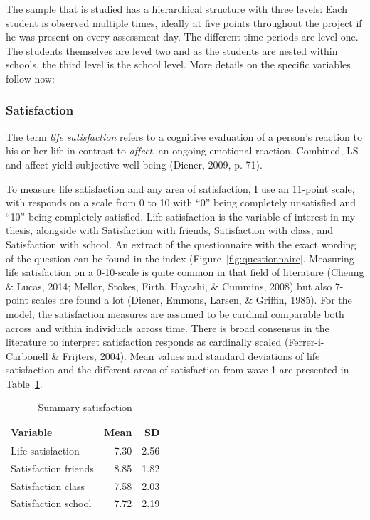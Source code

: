\documentclass[a4, 12pt]{article}
\begin{document}
\label{sec:variables}
The sample that is studied has a hierarchical structure with three levels: Each student is observed multiple times, ideally at five points throughout the project if he was present on every assessment day. The different time periods are level one. The students themselves are level two and as the students are nested within schools, the third level is the school level. More details on the specific variables follow now:

\hypertarget{satisfaction}{%
\subsubsection{Satisfaction}\label{satisfaction}}

The term \emph{life satisfaction} refers to a cognitive evaluation of a person's reaction to his or her life in contrast to \emph{affect}, an ongoing emotional reaction. Combined, LS and affect yield subjective well-being (Diener, 2009, p. 71).

To measure life satisfaction and any area of satisfaction, I use an 11-point scale, with responds on a scale from 0 to 10 with ``0'' being completely unsatisfied and ``10'' being completely satisfied. Life satisfaction is the variable of interest in my thesis, alongside with Satisfaction with friends, Satisfaction with class, and Satisfaction with school. An extract of the questionnaire with the exact wording of the question can be found in the index (Figure~\ref{fig:questionnaire}. Measuring life satisfaction on a 0-10-scale is quite common in that field of literature (Cheung \& Lucas, 2014; Mellor, Stokes, Firth, Hayashi, \& Cummins, 2008) but also 7-point scales are found a lot (Diener, Emmons, Larsen, \& Griffin, 1985). For the model, the satisfaction measures are assumed to be cardinal comparable both across and within individuals across time. There is broad consensus in the literature to interpret satisfaction responds as cardinally scaled (Ferrer-i-Carbonell \& Frijters, 2004). Mean values and standard deviations of life satisfaction and the different areas of satisfaction from wave 1 are presented in Table~\ref{tab:mean-LS}.

\begin{table}[H]

\caption{\label{tab:mean-LS}Summary satisfaction}
\centering
\begin{tabular}[t]{lrr}
\toprule
Variable & Mean & SD\\
\midrule
Life satisfaction & 7.30 & 2.56\\
Satisfaction friends & 8.85 & 1.82\\
Satisfaction class & 7.58 & 2.03\\
Satisfaction school & 7.72 & 2.19\\
\bottomrule
\end{tabular}
\end{table}
\end{document}
